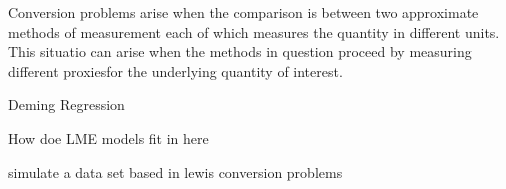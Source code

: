Conversion problems arise when the comparison is between two
approximate methods of measurement each of which measures the quantity in different units.
This situatio can arise when the methods in question proceed by measuring different proxiesfor the underlying
quantity of interest.

Deming Regression

How doe LME models fit in here

simulate a data set based in lewis conversion problems
